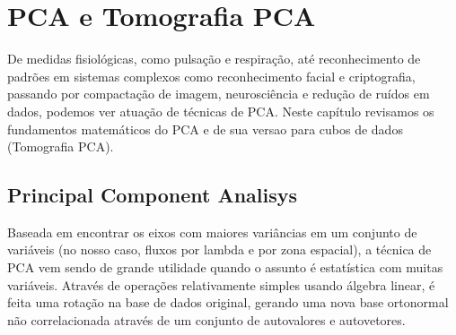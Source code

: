 


\chapter{PCA e Tomografia PCA}
\label{sec:PCAeTomoPCA}

De medidas fisiológicas, como pulsação e respiração, até reconhecimento de padrões em sistemas complexos como
reconhecimento facial e criptografia, passando por compactação de imagem, neurosciência e redução de ruídos em dados,
podemos ver atuação de técnicas de PCA. Neste capítulo revisamos os fundamentos matemáticos do PCA e de sua versao para
cubos de dados (Tomografia PCA).


\section{Principal Component Analisys}
\label{sec:PCAeTomoPCA:PCA}

Baseada em encontrar os eixos com maiores variâncias em um conjunto de variáveis (no nosso caso, fluxos por lambda e por
zona espacial), a técnica de PCA vem sendo de grande utilidade quando o assunto é estatística com muitas variáveis.
Através de operações relativamente simples usando álgebra linear, é feita uma rotação na base de dados original, gerando
uma nova base ortonormal não correlacionada através de um conjunto de autovalores e autovetores.

